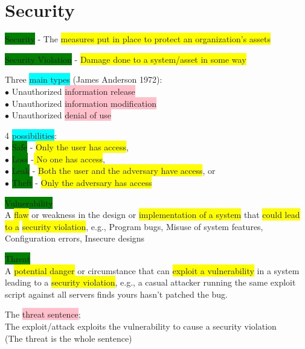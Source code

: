 \documentclass[tikz,border=10pt]{project_plan}
\newcommand{\bulletPoint}{\hspace{-3.1pt}$\bullet$ \hspace{5pt}}
\begin{document}
\section{Security}

\colorbox{green}{Security} - The \colorbox{yellow}{measures put in place to protect an organization's assets}

\colorbox{green}{Security Violation} - \colorbox{yellow}{Damage done to a system/asset in some way}

Three \colorbox{cyan}{main types} (James Anderson 1972):\\
\bulletPoint Unauthorized \colorbox{pink}{information release}\\
\bulletPoint Unauthorized \colorbox{pink}{information modification}\\
\bulletPoint Unauthorized \colorbox{pink}{denial of use}

\newpage

4 \colorbox{cyan}{possibilities}:\\
\bulletPoint \colorbox{green}{Safe} - \colorbox{yellow}{Only the user has access},\\
\bulletPoint \colorbox{green}{Loss}  -\colorbox{yellow}{ No one has access},\\
\bulletPoint \colorbox{green}{Leak} - \colorbox{yellow}{Both the user and the adversary have access}, or\\
\bulletPoint \colorbox{green}{Theft} - \colorbox{yellow}{Only the adversary has access}

\colorbox{green}{Vulnerability}\\
A \colorbox{yellow}{flaw} or weakness in the design or \colorbox{yellow}{implementation of a system} that \colorbox{yellow}{could lead to a}
\colorbox{yellow}{security violation}, e.g., Program bugs, Misuse of system features, Configuration errors, Insecure designs

\colorbox{green}{Threat}\\
A \colorbox{yellow}{potential danger} or circumstance that can \colorbox{yellow}{exploit a vulnerability} in a system leading to a
\colorbox{yellow}{security violation}, e.g., a casual attacker running the same exploit script against all servers finds
yours hasn't patched the bug.

The \colorbox{pink}{threat sentence};\\
The exploit/attack exploits the vulnerability to cause a security violation\\
(The threat is the whole sentence)
\end{document}
